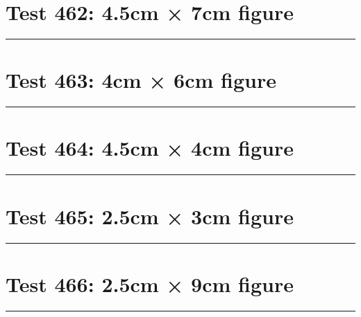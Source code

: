 \documentclass[a4paper,11pt]{article}
\begin{document}
\section*{Test 462: 4.5cm × 7cm figure}
\begin{swarmwrap}%
  \begin{minipage}[t]{4cm}
    \centering
    \rule{\linewidth}{7cm}
  \end{minipage}%
\end{swarmwrap}%
\swarmwrapnext
\lipsum[142]
\lipsum[143]
\lipsum[144]
\section*{Test 463: 4cm × 6cm figure}
\begin{swarmwrap}%
  \begin{minipage}[t]{4cm}
    \centering
    \rule{\linewidth}{6cm}
  \end{minipage}%
\end{swarmwrap}%
\swarmwrapnext
\lipsum[42]
\lipsum[43]
\lipsum[44]
\lipsum[45]
\lipsum[46]
\section*{Test 464: 4.5cm × 4cm figure}
\begin{swarmwrap}%
  \begin{minipage}[t]{4cm}
    \centering
    \rule{\linewidth}{4cm}
  \end{minipage}%
\end{swarmwrap}%
\swarmwrapnext
\lipsum[132]
\lipsum[133]
\lipsum[134]
\lipsum[135]
\lipsum[136]
\section*{Test 465: 2.5cm × 3cm figure}
\begin{swarmwrap}%
  \begin{minipage}[t]{2cm}
    \centering
    \rule{\linewidth}{3cm}
  \end{minipage}%
\end{swarmwrap}%
\swarmwrapnext
\lipsum[37]
\lipsum[38]
\lipsum[39]
\lipsum[40]
\section*{Test 466: 2.5cm × 9cm figure}
\begin{swarmwrap}%
  \begin{minipage}[t]{2cm}
    \centering
    \rule{\linewidth}{9cm}
  \end{minipage}%
\end{swarmwrap}%
\swarmwrapnext
\lipsum[94]
\lipsum[95]
\lipsum[96]
\end{document}
